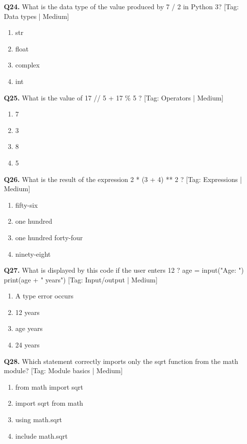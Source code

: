 \vspace{2mm}
\noindent\textbf{Q24.} What is the data type of the value produced by 7 / 2 in Python 3? \hfill [Tag: Data types | Medium]
\begin{enumerate}[label=(\alph*),topsep=2pt,itemsep=1pt,partopsep=0pt,parsep=0pt]
    \item {str}
    \item {float}
    \item {complex}
    \item {int}
\end{enumerate}
\vspace{2mm}
\noindent\textbf{Q25.} What is the value of 17 // 5 + 17 \% 5 ? \hfill [Tag: Operators | Medium]
\begin{enumerate}[label=(\alph*),topsep=2pt,itemsep=1pt,partopsep=0pt,parsep=0pt]
    \item {7}
    \item {3}
    \item {8}
    \item {5}
\end{enumerate}
\vspace{2mm}
\noindent\textbf{Q26.} What is the result of the expression 2 * (3 + 4) ** 2 ? \hfill [Tag: Expressions | Medium]
\begin{enumerate}[label=(\alph*),topsep=2pt,itemsep=1pt,partopsep=0pt,parsep=0pt]
    \item {fifty-six}
    \item {one hundred}
    \item {one hundred forty-four}
    \item {ninety-eight}
\end{enumerate}
\vspace{2mm}
\noindent\textbf{Q27.} What is displayed by this code if the user enters 12 ? age = input("Age: ") print(age + " years") \hfill [Tag: Input/output | Medium]
\begin{enumerate}[label=(\alph*),topsep=2pt,itemsep=1pt,partopsep=0pt,parsep=0pt]
    \item {A type error occurs}
    \item {12 years}
    \item {age years}
    \item {24 years}
\end{enumerate}
\vspace{2mm}
\noindent\textbf{Q28.} Which statement correctly imports only the sqrt function from the math module? \hfill [Tag: Module basics | Medium]
\begin{enumerate}[label=(\alph*),topsep=2pt,itemsep=1pt,partopsep=0pt,parsep=0pt]
    \item {from math import sqrt}
    \item {import sqrt from math}
    \item {using math.sqrt}
    \item {include math.sqrt}
\end{enumerate}
